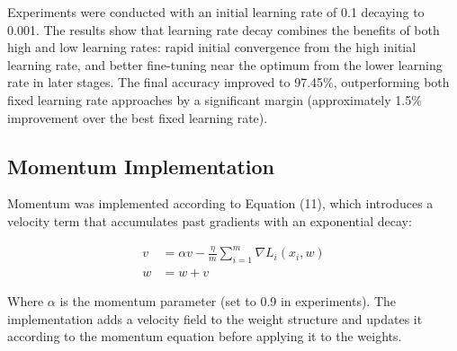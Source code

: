 \documentclass{article}
\begin{document}
\noindent Experiments were conducted with an initial learning rate of 0.1 decaying 
to 0.001. The results show that learning rate decay combines the benefits of both 
high and low learning rates: rapid initial convergence from the high initial 
learning rate, and better fine-tuning near the optimum from the lower learning 
rate in later stages. The final accuracy improved to 97.45\%, outperforming both 
fixed learning rate approaches by a significant margin (approximately 1.5\% 
improvement over the best fixed learning rate).

\subsection{Momentum Implementation}

Momentum was implemented according to Equation (11), which introduces a velocity term that accumulates past gradients with an exponential decay:

\begin{align}
v &= \alpha v - \frac{\eta}{m}\sum_{i=1}^{m}\nabla L_{i}(x_{i},w) \\
w &= w + v
\end{align}

Where $\alpha$ is the momentum parameter (set to 0.9 in experiments). The implementation adds a velocity field to the weight structure and updates it according to the momentum equation before applying it to the weights.
\end{document}
